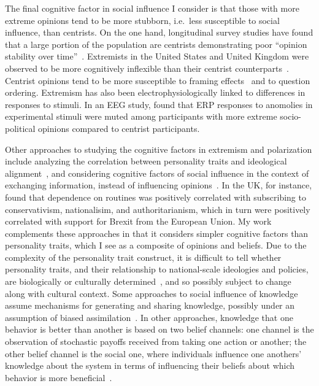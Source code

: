 \documentclass[12pt,letterpaper]{article}
\begin{document}
The final cognitive factor in social influence I consider is that those with
more extreme opinions tend to be more stubborn, i.e.\ less susceptible to
social influence, than centrists. On the one hand, longitudinal survey studies
have found that a large portion of the population are centrists demonstrating
poor ``opinion stability over time''~\cite{Converse1964,Zaller1992,Kinder2017}. 
Extremists in the United States and United Kingdom were observed to be 
more cognitively inflexible than their centrist counterparts~\cite{Zmigrod2019a}.
Centrist opinions tend to be more susceptible to framing effects~\cite{Chong2007}
and to question ordering. Extremism has also been electrophysiologically linked
to differences in responses to stimuli. In an EEG study,  found that ERP
responses to anomolies in experimental stimuli were muted among participants
with more extreme socio-political opinions compared to centrist participants.

Other approaches to studying the cognitive factors in extremism and polarization
include analyzing the correlation between personality traits and ideological
alignment~\cite{Rollwage2019}, and considering cognitive factors of social influence 
in the context of exchanging information, instead of influencing opinions~\cite{Carley1990,Carley1991,Bala1998}.
In the UK, for instance,  found that dependence on routines was
positively correlated with subscribing to conservativism, nationalisim, and
authoritarianism, which in turn were positively correlated with support for
Brexit from the European Union. My work complements these approaches in that
it considers simpler cognitive factors than personality traits, which I see
as a composite of opinions and beliefs. Due to the complexity of the
personality trait construct, it is difficult to tell whether personality traits,
and their relationship to national-scale ideologies and policies,
are biologically or culturally determined~\cite{Claidiere2012c,Smaldino2019d},
and so possibly subject to change along with cultural context.
Some approaches to social influence of knowledge assume mechanisms for generating and
sharing knowledge, possibly under an assumption of biased 
assimilation~\cite{Mark1998,Mark1998a,Mark2003}. In other approaches, 
knowledge that one behavior is better than another is based on two
belief channels: one channel is the observation of stochastic payoffs 
received from taking one action or another; the other belief channel is 
the social one, where individuals influence one anothers' knowledge about
the system in terms of influencing their beliefs about which behavior is
more beneficial~\cite{Zollman2007,OConnor2019e}.
\end{document}
